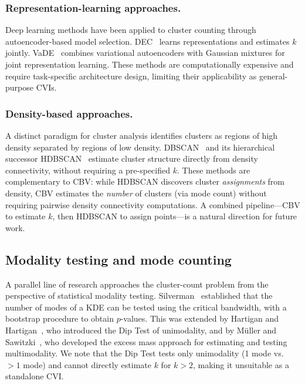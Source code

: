 \documentclass[journal]{IEEEtran}
\begin{document}
\subsubsection*{Representation-learning approaches.}
Deep learning methods have been applied to cluster counting through autoencoder-based model selection. DEC~\cite{xie2016deep} learns representations and estimates $k$ jointly. VaDE~\cite{jiang2017vade} combines variational autoencoders with Gaussian mixtures for joint representation learning. These methods are computationally expensive and require task-specific architecture design, limiting their applicability as general-purpose CVIs.

\subsubsection*{Density-based approaches.}
A distinct paradigm for cluster analysis identifies clusters as regions of high density separated by regions of low density. DBSCAN~\cite{ester1996density} and its hierarchical successor HDBSCAN~\cite{campello2013density, mcinnes2017hdbscan} estimate cluster structure directly from density connectivity, without requiring a pre-specified $k$. These methods are complementary to CBV: while HDBSCAN discovers cluster \emph{assignments} from density, CBV estimates the \emph{number} of clusters (via mode count) without requiring pairwise density connectivity computations. A combined pipeline---CBV to estimate $k$, then HDBSCAN to assign points---is a natural direction for future work.

\subsection{Modality testing and mode counting}
\label{sec:modality-testing}

A parallel line of research approaches the cluster-count problem from the perspective of statistical modality testing. Silverman~\cite{silverman1981using} established that the number of modes of a KDE can be tested using the critical bandwidth, with a bootstrap procedure to obtain $p$-values. This was extended by Hartigan and Hartigan~\cite{hartigan1985dip}, who introduced the Dip Test of unimodality, and by M\"uller and Sawitzki~\cite{muller1991excess}, who developed the excess mass approach for estimating and testing multimodality. We note that the Dip Test tests only unimodality (1 mode vs.\ $>1$ mode) and cannot directly estimate $k$ for $k > 2$, making it unsuitable as a standalone CVI.
\end{document}
